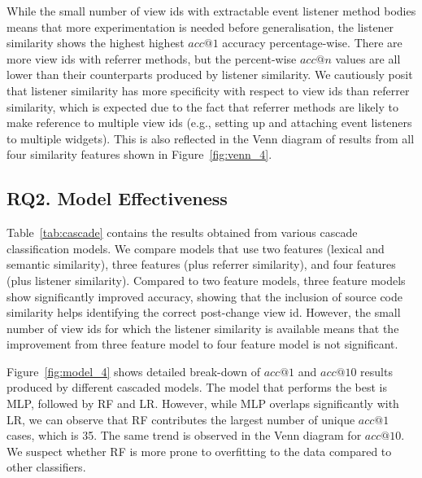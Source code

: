 \documentclass[sigconf]{acmart}
\begin{document}
While the small number of view ids with extractable event listener method
bodies means that more experimentation is needed before generalisation, the
listener similarity shows the highest highest $acc@1$ accuracy
percentage-wise. There are more view ids with referrer methods, but the
percent-wise $acc@n$ values are all lower than their counterparts produced by
listener similarity. We cautiously posit that listener similarity has more
specificity with respect to view ids than referrer similarity, which is
expected due to the fact that referrer methods are likely to make reference to
multiple view ids (e.g., setting up and attaching event listeners to multiple
widgets). This is also reflected in the Venn diagram of results from all four
similarity features shown in Figure~\ref{fig:venn_4}.


\subsection{RQ2. Model Effectiveness}

Table~\ref{tab:cascade} contains the results obtained from various cascade
classification models. We compare models that use two features (lexical and
semantic similarity), three features (plus referrer similarity), and four
features (plus listener similarity). Compared to two feature models, three
feature models show significantly improved accuracy, showing that the
inclusion of source code similarity helps identifying the correct post-change
view id. However, the small number of view ids for which the listener
similarity is available means that the improvement from three feature model to
four feature model is not significant.

Figure~\ref{fig:model_4} shows detailed break-down of $acc@1$ and $acc@10$
results produced by different cascaded models. The model that performs the
best is MLP, followed by RF and LR. However, while MLP overlaps significantly
with LR, we can observe that RF contributes the largest number of unique
$acc@1$ cases, which is 35. The same trend is observed in the Venn diagram for
$acc@10$. We suspect whether RF is more prone to overfitting to the data
compared to other classifiers.
\end{document}
